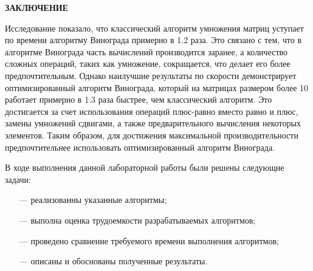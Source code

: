 \begin{center}
    \textbf{ЗАКЛЮЧЕНИЕ}
\end{center}

Исследование показало, что классический алгоритм умножения матриц уступает по времени алгоритму Винограда примерно в 1.2 раза. Это связано с тем, что в алгоритме Винограда часть вычислений производится заранее, а количество сложных операций, таких как умножение, сокращается, что делает его более предпочтительным. Однако наилучшие результаты по скорости демонстрирует оптимизированный алгоритм Винограда, который на матрицах размером более 10 работает примерно в 1.3 раза быстрее, чем классический алгоритм. Это достигается за счет использования операций плюс-равно вместо равно и плюс, замены умножений сдвигами, а также предварительного вычисления некоторых элементов. Таким образом, для достижения максимальной производительности предпочтительнее использовать оптимизированный алгоритм Винограда.

\vspace{5mm}

В ходе выполнения данной лабораторной работы были решены следующие задачи:
\begin{itemize}
    \item[---] реализованны указанные алгоритмы;
    \item[---] выполна оценка трудоемкости разрабатываемых алгоритмов;
    \item[---] проведено сравнение требуемого времени выполнения алгоритмов;
    \item[---] описаны и обоснованы полученные результаты.
\end{itemize}